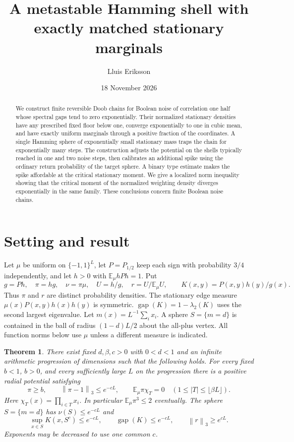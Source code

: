 \documentclass[11pt]{article}
\title{A metastable Hamming shell with exactly matched stationary marginals}
\author{Lluis Eriksson}
\date{18 November 2026}
\newtheorem{theorem}{Theorem}[section]
\newcommand{\E}{\mathbb E}
\newcommand{\norm}[1]{\left\|#1\right\|}
\begin{document}
\maketitle
\begin{abstract}
We construct finite reversible Doob chains for Boolean noise of correlation one half whose spectral gaps tend to zero exponentially. Their normalized stationary densities have any prescribed fixed floor below one, converge exponentially to one in cubic mean, and have exactly uniform marginals through a positive fraction of the coordinates. A single Hamming sphere of exponentially small stationary mass traps the chain for exponentially many steps. The construction adjusts the potential on the shells typically reached in one and two noise steps, then calibrates an additional spike using the ordinary return probability of the target sphere. A binary type estimate makes the spike affordable at the critical stationary moment. We give a localized norm inequality showing that the critical moment of the normalized weighting density diverges exponentially in the same family. These conclusions concern finite Boolean noise chains.
\end{abstract}

\section{Setting and result}
Let $\mu$ be uniform on $\{-1,1\}^L$, let $P=P_{1/2}$ keep each sign with probability $3/4$ independently, and let $h>0$ with $\E_\mu hPh=1$. Put
\[
 g=Ph,\quad \pi=hg,\quad \nu=\pi\mu,\quad U=h/g,\quad r=U/\E_\mu U,
 \qquad K(x,y)=P(x,y)h(y)/g(x).
\]
Thus $\pi$ and $r$ are distinct probability densities. The stationary edge measure $\mu(x)P(x,y)h(x)h(y)$ is symmetric. $\operatorname{gap}(K)=1-\lambda_2(K)$ uses the second largest eigenvalue. Let $m(x)=L^{-1}\sum_i x_i$. A sphere $S=\{m=d\}$ is contained in the ball of radius $(1-d)L/2$ about the all-plus vertex. All function norms below use $\mu$ unless a different measure is indicated.

\begin{theorem}\label{main}
There exist fixed $d,\beta,c>0$ with $0<d<1$ and an infinite arithmetic progression of dimensions such that the following holds. For every fixed $b<1$, $b>0$, and every sufficiently large $L$ on the progression there is a positive radial potential satisfying
\[
 \pi\ge b,\qquad \norm{\pi-1}_3\le e^{-cL},\qquad
 \E_\mu\pi\chi_T=0\quad (1\le |T|\le\lfloor\beta L\rfloor).
\]
Here $\chi_T(x)=\prod_{i\in T}x_i$. In particular $\E_\mu\pi^3\le2$ eventually. The sphere $S=\{m=d\}$ has $\nu(S)\le e^{-cL}$ and
\[
 \sup_{x\in S}K(x,S^c)\le e^{-cL},\qquad
 \operatorname{gap}(K)\le e^{-cL},\qquad \norm{r}_3\ge e^{cL}.
\]
Exponents may be decreased to use one common $c$.
\end{theorem}
\end{document}
